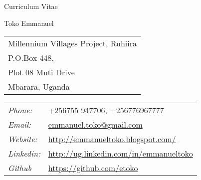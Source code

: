 \documentclass[12pt,a4paper]{article}
\def\name{Toko Emmanuel}
\begin{document}
\centerline{\Huge Curriculum Vitae \\}
\bigskip
\bigskip
\bigskip

{\LARGE \name}

\bigskip

\begin{minipage}[t]{0.495\textwidth}
 \begin{tabular}{l}
   Millennium Villages Project, Ruhiira \\
  P.O.Box 448, \\
  Plot 08 Muti Drive \\
  Mbarara, Uganda
  \end{tabular}
\end{minipage}
\begin{minipage}[t]{0.495\textwidth}
  \begin{tabulary}{\linewidth}{LL}
  \textit{Phone:} & +256755 947706, +256776967777  \\
  \textit{Email:} & \href{mailto:emmanuel.toko@gmail.com}{emmanuel.toko@gmail.com} \\
  \textit{Website:} & \href{http://emmanueltoko.blogspot.com/}{http://emmanueltoko.blogspot.com/} \\
  \textit{Linkedin:} & \href{http://ug.linkedin.com/in/emmanueltoko}{http://ug.linkedin.com/in/emmanueltoko}\\
  \textit{Github} & \href{https://github.com/etoko}{https://github.com/etoko}\\
  \end{tabulary}
\end{minipage}
\end{document}
